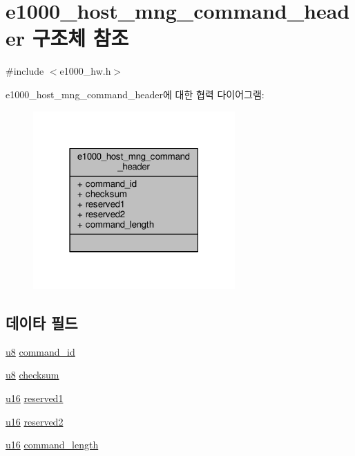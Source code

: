\hypertarget{structe1000__host__mng__command__header}{}\section{e1000\+\_\+host\+\_\+mng\+\_\+command\+\_\+header 구조체 참조}
\label{structe1000__host__mng__command__header}


{\ttfamily \#include $<$e1000\+\_\+hw.\+h$>$}



e1000\+\_\+host\+\_\+mng\+\_\+command\+\_\+header에 대한 협력 다이어그램\+:
\nopagebreak
\begin{figure}[H]
\begin{center}
\leavevmode
\includegraphics[width=219pt]{structe1000__host__mng__command__header__coll__graph}
\end{center}
\end{figure}
\subsection*{데이타 필드}
\begin{DoxyCompactItemize}
\item 
\hyperlink{lib_2igb_2e1000__osdep_8h_a8baca7e76da9e0e11ce3a275dd19130c}{u8} \hyperlink{structe1000__host__mng__command__header_aa5d253518ff72b4ed6148c872420aa46}{command\+\_\+id}
\item 
\hyperlink{lib_2igb_2e1000__osdep_8h_a8baca7e76da9e0e11ce3a275dd19130c}{u8} \hyperlink{structe1000__host__mng__command__header_afd93107fee98407f162be1294fb053fd}{checksum}
\item 
\hyperlink{lib_2igb_2e1000__osdep_8h_acdc9cf0314be0ae5a01d6d4379a95edd}{u16} \hyperlink{structe1000__host__mng__command__header_a04bb2d56146c948328208580316909cb}{reserved1}
\item 
\hyperlink{lib_2igb_2e1000__osdep_8h_acdc9cf0314be0ae5a01d6d4379a95edd}{u16} \hyperlink{structe1000__host__mng__command__header_abb0880e72f68cfaf6a809f9e12d88e61}{reserved2}
\item 
\hyperlink{lib_2igb_2e1000__osdep_8h_acdc9cf0314be0ae5a01d6d4379a95edd}{u16} \hyperlink{structe1000__host__mng__command__header_ae417ce9126652dc4c9652aeb0a44ad32}{command\+\_\+length}
\end{DoxyCompactItemize}


